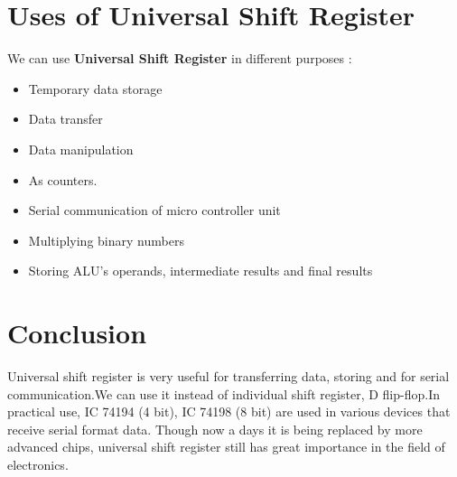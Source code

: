\documentclass{article}
\begin{document}
\begin{flushleft}
\section{Uses of Universal Shift Register}
We can use \textbf{Universal Shift Register} in different purposes : \\
\begin{itemize}
\item Temporary data storage
\item Data transfer
\item Data manipulation
\item As counters.
\item Serial communication of micro controller unit
\item Multiplying binary numbers
\item Storing  ALU's operands, intermediate results and final results
\end{itemize}
\section{Conclusion}
Universal shift register is very useful for transferring data, storing and for serial communication.We can use it instead of individual shift register, D flip-flop.In practical use, IC 74194 (4 bit), IC 74198 (8 bit) are used in various devices that receive serial format data. Though now a days it is being replaced by more advanced chips, universal shift register still has great importance in the field of electronics.
\end{flushleft}
\end{document}
